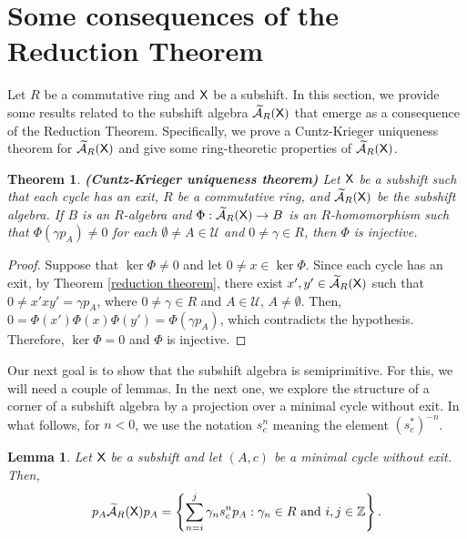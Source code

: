 \documentclass[a4paper,12pt]{amsart}
\newtheorem{theorem}[equation]{Theorem}
\newtheorem{lemma}[equation]{Lemma}
\theoremstyle{definition}
\theoremstyle{remark}
\numberwithin{equation}{section}
\newcommand{\osf}{{\normalfont \textsf{X}}}
\newcommand{\ualgshift}{\TCA_R(\osf)}
\newcommand{\Z}{\mathbb{Z}}
\newcommand{\CA}{\mathcal{A}}
\newcommand{\TCA}{\widetilde{\CA}}
\newcommand{\TCB}{\mathcal{U}}
\begin{document}
\section{Some consequences of the Reduction Theorem}\label{consequencesofreduction}

Let $R$ be a commutative ring and $\osf$ be a subshift. In this section, we provide some results related to the subshift algebra $\ualgshift$ that emerge as a consequence of the Reduction Theorem. Specifically, we prove a Cuntz-Krieger uniqueness theorem for $\ualgshift$ and give some ring-theoretic properties of $\ualgshift$.

\begin{theorem}\label{ckuniqueness}{\rm {\bf (Cuntz-Krieger uniqueness theorem)}} Let $\osf$ be a subshift such that each cycle has an exit, $R$ be a commutative ring, and $\ualgshift$ be the subshift algebra. If $B$ is an $R$-algebra and $\Phi:\ualgshift\rightarrow B$ is an $R$-homomorphism such that $\Phi(\gamma p_A)\neq 0$ for each $\emptyset \neq A\in \TCB$ and $0\neq \gamma \in R$,  then $\Phi$ is injective.
\end{theorem}

\begin{proof} Suppose that $\operatorname{ker}\Phi\neq 0$ and let $0\neq x\in \operatorname{ker}\Phi$. Since each cycle has an exit, by Theorem \ref{reduction theorem}, there exist $x',y'\in \ualgshift$ such that $0\neq x'xy'=\gamma p_A$, where $0\neq \gamma\in R$ and $ A\in \TCB$, $A \neq \emptyset$. Then, $0=\Phi(x')\Phi(x)\Phi(y')=\Phi(\gamma p_A)$, which contradicts the hypothesis. Therefore, $\operatorname{ker}\Phi=0$ and $\Phi$ is injective.
\end{proof}


Our next goal is to show that the subshift algebra is semiprimitive. For this, we will need a couple of lemmas. 
In the next one, we explore the structure of a corner of a subshift algebra by a projection over a minimal cycle without exit. In what follows, for $n<0$, we use the notation $s_c^n$ meaning the element $(s_c^*)^{-n}$. 


\begin{lemma}\label{cornerlemma} Let $\osf$ be a subshift and let $(A,c)$ be a minimal cycle without exit. Then, $$p_A \ualgshift p_A=\left\{\sum\limits_{n=i}^j\gamma_n s_c^np_A: \gamma_n\in R \text{ and }i,j\in \Z\right\}.$$
\end{lemma}
\end{document}
